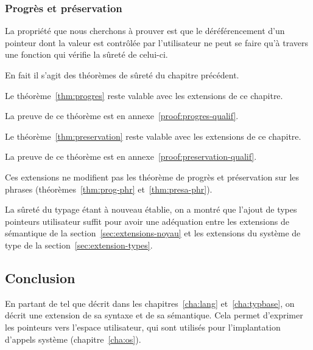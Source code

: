 \subsubsection*{Progrès et préservation}

La propriété que nous cherchons à prouver est que le déréférencement d'un
pointeur dont la valeur est contrôlée par l'utilisateur ne peut se faire qu'à
travers une fonction qui vérifie la sûreté de celui-ci.

En fait il s'agit des théorèmes de sûreté du chapitre précédent.

\begin{theorem}
\label{thm:progres-qual}

Le théorème~\ref{thm:progres} reste valable avec les extensions de ce chapitre.

\end{theorem}

La preuve de ce théorème est en annexe~\ref{proof:progres-qualif}.


\begin{theorem}

\label{thm:preservation-qualif}

Le théorème~\ref{thm:preservation} reste valable avec les extensions de ce
chapitre.

\end{theorem}

La preuve de ce théorème est en annexe~\ref{proof:preservation-qualif}.

Ces extensions ne modifient pas les théorème de progrès et préservation sur les
phrases (théorèmes~\ref{thm:prog-phr} et~\ref{thm:presa-phr}).

La sûreté du typage étant à nouveau établie, on a montré que l'ajout de types
pointeurs utilisateur suffit pour avoir une adéquation entre les extensions de
sémantique de la section~\ref{sec:extensions-noyau} et les extensions du système
de type de la section~\ref{sec:extension-types}.

\subsection*{Conclusion}

En partant de \langname tel que décrit dans les chapitres~\ref{cha:lang}
et~\ref{cha:typbase}, on décrit une extension de sa syntaxe et de sa sémantique.
Cela permet d'exprimer les pointeurs vers
l'espace utilisateur, qui sont utilisés pour l'implantation d'appels système
(chapitre~\ref{cha:os}).

